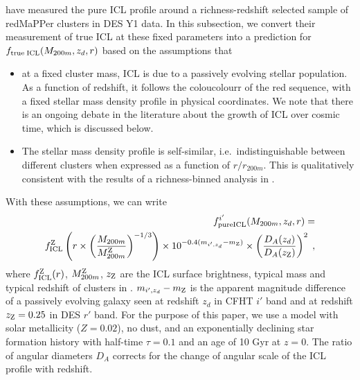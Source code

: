 {\citet{icl} have measured the pure ICL profile around a richness-redshift selected sample of redMaPPer clusters in DES Y1 data. In this subsection, we convert their measurement of true ICL at these fixed parameters into a prediction for $f_{\rm true\; ICL}(M_{200m}, z_{d}, r)$ based on the assumptions that
\begin{itemize}
\item at a fixed cluster mass, ICL is due to a passively evolving stellar population. As a function of redshift, it follows the coloucolourr of the red sequence, with a fixed stellar mass density profile in physical coordinates. We note that there is an ongoing debate in the literature about the growth of ICL over cosmic time, which is discussed below.
\item The stellar mass density profile is self-similar, i.e.~indistinguishable between different clusters when expressed as a function of $r/r_{200m}$. This is qualitatively consistent with the results of a richness-binned analysis in \citet{icl}.
\end{itemize}

With these assumptions, we can write
\begin{eqnarray}
f_{\rm pure ICL}^{i'}(M_{200m}, z_{d}, r) = \nonumber \\ 
f_{\rm ICL}^{\rm Z}\left(r\times \left(\frac{M_{200m}}{M_{200m}^{\rm Z}}\right)^{-1/3}\right) \times 10^{-0.4(m_{i',z_d}-m_{\rm Z})} \times \left(\frac{D_{A}(z_d)}{D_{A}(z_{\rm Z})}\right)^2 \; ,
\label{eqn:ftransform}
\end{eqnarray}
where $f_{\rm ICL}^{\rm Z}(r)$, $M_{200m}^{\rm Z}$, $z_{\rm Z}$ are the ICL surface brightness, typical mass and typical redshift of clusters in \citet{icl}. $m_{i',z_d}-m_{\rm Z}$ is the apparent magnitude difference of a passively evolving galaxy seen at redshift $z_d$ in CFHT $i'$ band and at redshift $z_{\rm Z}=0.25$ in DES $r'$ band. For the purpose of this paper, we use a \citet{2003MNRAS.344.1000B} model with solar metallicity ($Z=0.02$), no dust, and an exponentially declining star formation history with half-time $\tau=0.1$ and an age of 10 Gyr at $z=0$. The ratio of angular diameters $D_A$ corrects for the change of angular scale of the ICL profile with redshift.


}
